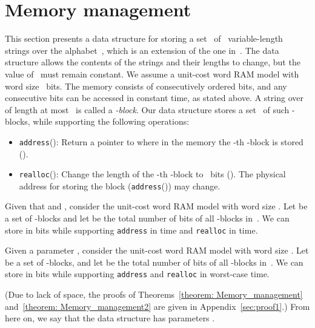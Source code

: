 \documentclass{llncs}
\begin{document}
\section{Memory management}\label{sec:memory}

This section presents a data structure for storing a set~ of
~variable-length strings over the alphabet~,
which is an extension of the one
in~\cite{NavSad10}.
The data structure allows the contents of the strings and their lengths to
change, but the value of~ must remain constant.
We assume a unit-cost word RAM model with word size~ bits.
The memory consists of consecutively ordered bits, and any consecutive  bits
can be accessed in constant time, as stated above.
A string over  of length at most~ is called
a \emph{-block}.
Our data structure stores a set~ of  such -blocks,
while supporting the following operations:
\begin{itemize}
\item[{\raise0.3pt\hbox{}}]
  \texttt{address}():
  Return a pointer to where in the memory the -th -block
  is stored ().
\item[{\raise0.3pt\hbox{}}]
  \texttt{realloc}():
  Change the length of the -th -block to ~bits
  ().
  The physical address for storing the block (\texttt{address}()) may change.
\end{itemize}

\begin{theorem}
\label{theorem: Memory_management}
Given that  and ,
consider the unit-cost word RAM model with word size .
Let   be a set of -blocks
and let  be the total number of bits of all -blocks in~.
We can store  in  bits while supporting
\textnormal{\texttt{address}} in  time and
\textnormal{\texttt{realloc}} in  time.
\end{theorem}

\begin{theorem}
\label{theorem: Memory_management2}
Given a parameter ,
consider the unit-cost word RAM model with word size .
Let   be a set of -blocks,
and let
 be the total number of bits of all -blocks in~.
We can store  in  bits while supporting
\textnormal{\texttt{address}} and \textnormal{\texttt{realloc}}
in worst-case  time.
\end{theorem}

\noindent
(Due to lack of space, the proofs of
Theorems~\ref{theorem: Memory_management}
and~\ref{theorem: Memory_management2}
are given in Appendix~\ref{sec:proof1}.)
From here on, we say that the data structure has parameters .
\end{document}
